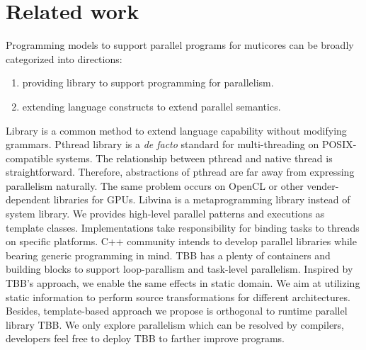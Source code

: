 \section{Related work}\label{sec:related}
Programming models to support parallel programs for muticores can be
broadly categorized into directions:
\begin{enumerate}
\item providing library to support programming for parallelism.
\item extending language constructs to extend parallel semantics.
\end{enumerate}

Library is a common method to extend language capability
without modifying grammars. Pthread library is a \textit{de facto} standard for
multi-threading on POSIX-compatible systems. The relationship between
pthread and native thread is straightforward. Therefore, abstractions
of pthread are far away from expressing parallelism naturally. The same problem occurs on OpenCL or other vender-dependent
libraries for GPUs. Libvina is a metaprogramming library instead of
system library. We provides high-level parallel patterns
and executions as template classes. Implementations take
responsibility for binding tasks to threads on specific platforms. C++
community intends to develop parallel libraries while bearing generic programming in mind. TBB  has a plenty of
containers and building blocks to support loop-parallism and
task-level parallelism.  Inspired by TBB's approach, we enable the
same effects in static domain. We aim at utilizing static information
to perform source
transformations for different architectures. Besides, template-based approach we propose is orthogonal to runtime parallel
library TBB. We only explore parallelism which can be resolved by compilers, developers feel free to deploy TBB to
farther improve programs.





